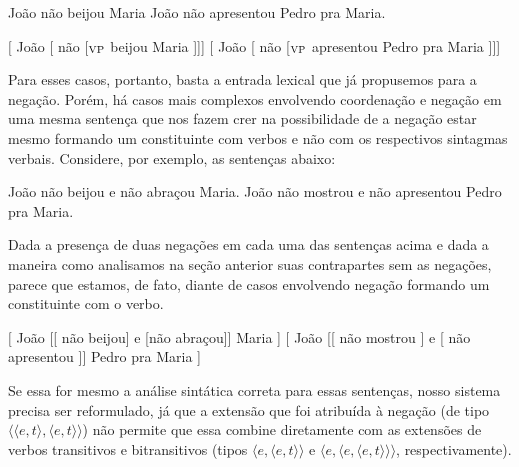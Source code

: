 \begin{exe}
\ex\label{tru}
\begin{xlist}
\ex João não beijou Maria\label{trua}
\ex João não apresentou Pedro pra Maria.\label{trub}
\end{xlist}
\end{exe}

\begin{exe}
\ex\label{try}
\begin{xlist}
\ex $[$ João [ não [$_{\text{\textsc{VP}}}$ beijou Maria ]]]\label{trya}
\ex $[$ João [ não [$_{\text{\textsc{VP}}}$ apresentou Pedro pra Maria ]]]\label{tryb}
\end{xlist}
\end{exe}

\n Para esses casos, portanto, basta a entrada lexical que já
propusemos para a nega\-ção. Porém, há casos mais complexos
envolvendo coordena\-ção e nega\-ção em uma mesma senten\-ça que
nos fazem crer na possibilidade de a nega\-ção estar mesmo
formando um constituinte com verbos e não com os respectivos
sintagmas verbais. Considere, por exemplo, as senten\-ças abaixo:

\begin{exe}
\ex\label{trw}
\begin{xlist}
\ex João não beijou e não abraçou Maria.\label{trwa}
\ex João não mostrou e não apresentou Pedro pra Maria.\label{trwb}
\end{xlist}
\end{exe}

\n Dada a presen\-ça de duas nega\-çõ\-es em cada uma das
senten\-ças acima e dada a maneira como analisamos na se\-ção
anterior suas contrapartes sem as nega\-çõ\-es, parece que estamos,
de fato, diante de casos envolvendo  nega\-ção formando um
constituinte com o verbo.

\begin{exe}
\ex\label{arg}
\begin{xlist}
\ex $[$ João [[ não beijou] e [não abraçou]] Maria ]\label{arga}
\ex $[$ João [[ não mostrou ] e [ não apresentou ]] Pedro pra Maria ]\label{argb}
\end{xlist}
\end{exe}

\n Se essa for mesmo a análise sintática correta para essas
senten\-ças, nosso sistema precisa ser reformulado, já que a
extensão que foi atribuída à nega\-ção (de tipo $\langle\langle
e,t\rangle,\langle e,t\rangle\rangle$) não permite que essa
combine diretamente com as extensões de verbos transitivos e
bitransitivos (tipos $\langle e,\langle e,t\rangle\rangle$ e
$\langle e,\langle e,\langle e,t\rangle\rangle\rangle$,
respectivamente).

